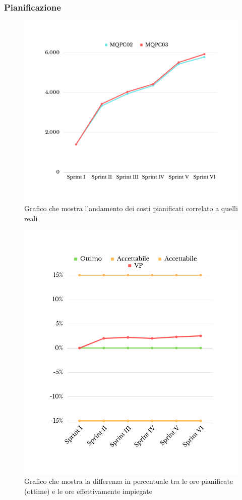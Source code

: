 \subsubsection{Pianificazione}
\begin{figure}[H]
	\centering
	\includegraphics[scale=0.5]{img/BCWS-ACWS.png}
	\caption{Grafico che mostra l'andamento dei costi pianificati correlato a quelli reali}
\end{figure}
\begin{figure}[H]
	\centering
	\includegraphics[scale=0.5]{img/SV.png}
	\caption{Grafico che mostra la differenza in percentuale tra le ore pianificate (ottime) e le ore effettivamente impiegate}
\end{figure}
